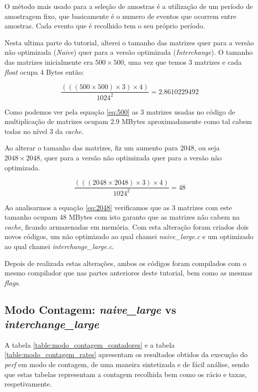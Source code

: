 \documentclass[conference,compsoc]{IEEEtran}
\begin{document}
O método mais usado para a seleção de amostras é a utilização de um período de amostragem fixo, que basicamente é o numero de eventos que ocorrem entre amostras. Cada evento que é recolhido tem o seu próprio período. 

Nesta ultima parte do tutorial, alterei o tamanho das matrizes quer para a versão não optimizada (\textit{Naive}) quer para a versão optimizada (\textit{Interchange}). O tamanho das matrizes inicialmente era $500\times500$, uma vez que temos 3 matrizes e cada \textit{float} ocupa 4 Bytes então:

\begin{equation}
\frac{(((500\times500)\times3)\times4)}{1024^2} = 2.8610229492
\label{eq:500}
\end{equation} 

Como podemos ver pela equação \ref{eq:500} as 3 matrizes usadas no código de multiplicação de matrizes ocupam 2.9 MBytes aproximadamente como tal cabem todas no nível 3 da \textit{cache}. 

Ao alterar o tamanho das matrizes, fiz um aumento para 2048, ou seja $2048\times2048$, quer para a versão não optimizada quer para a versão não optimizada. 

\begin{equation}
\frac{(((2048\times2048)\times3)\times4)}{1024^2} = 48
\label{eq:2048}
\end{equation} 

Ao analisarmos a equação \ref{eq:2048} verificamos que as 3 matrizes com este tamanho ocupam 48 MBytes com isto garanto que as matrizes não cabem na \textit{cache}, ficando armazenadas em memória. Com esta alteração foram criados dois novos códigos, um não optimizado ao qual chamei \textit{naive\_large.c} e um optimizado ao qual chamei \textit{interchange\_large.c}.

Depois de realizada estas alterações, ambos os códigos foram compilados com o mesmo compilador que nas partes anteriores deste tutorial, bem como as mesmas \textit{flags}.

\subsection{Modo Contagem: \textit{naive\_large} vs \textit{interchange\_large}}

A tabela \ref{table:modo_contagem_contadores} e a tabela \ref{table:modo_contagem_rates} apresentam os resultados obtidos da execução do \textit{perf} em modo de contagem, de uma maneira sintetizada e de fácil análise, sendo que estas tabelas representam a contagem recolhida bem como os rácio e taxas, respetivamente.
\end{document}
